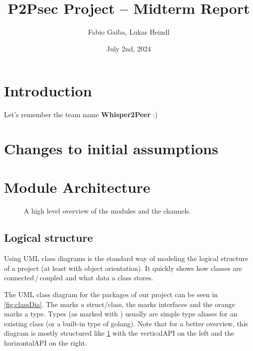 \documentclass[a4paper,english,10pt,NET]{tumarticle}
\title{P2Psec Project -- Midterm Report}
\author{Fabio Gaiba, Lukas Heindl}
\date{July 2nd, 2024}
\begin{document}
\maketitle
\thispagestyle{tumarticle}

\section{Introduction}

Let's remember the team name \textbf{Whisper2Peer} :)


\section{Changes to initial assumptions}


\section{Module Architecture}

\begin{figure}
	\centering
	
	\caption{A high level overview of the modules and the channels.}
	\label{fig:overview}
\end{figure}

\subsection{Logical structure}
Using UML class diagrams is the standard way of modeling the logical structure of a project (at least with object orientation).
It quickly shows how classes are connected\,/\,coupled and what data a class stores.

The UML class diagram for the packages of our project can be seen in \cref{fig:classDia}.
The  marks a struct/class, the  marks interfaces and the orange  marks a type.
Types (as marked with ) usually are simple type aliases for an existing class (or a built-in type of golang).
Note that for a better overview, this diagram is mostly structured like \cref{fig:overview} with the verticalAPI on the left and the horizontalAPI on the right.
\end{document}
